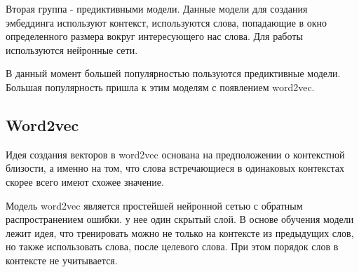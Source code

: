 \documentclass[a4paper,14pt]{article}
\begin{document}

Вторая группа - предиктивными модели.
Данные модели для создания эмбеддинга используют контекст, используются слова, попадающие в окно определенного размера вокруг интересующего нас слова.
Для работы используются нейронные сети.

В данный момент большей популярностью пользуются предиктивные модели.
Большая популярность пришла к этим моделям с появлением word2vec.

\subsection{Word2vec}
	
	Идея создания векторов в word2vec основана на предположении о контекстной близости, а именно на том, что слова встречающиеся в одинаковых контекстах скорее всего имеют схожее значение.
	
	Модель word2vec является простейшей нейронной сетью с обратным распространением ошибки.
	у нее один скрытый слой.
	В основе обучения модели лежит идея, что тренировать можно не только на контексте из предыдущих слов, но также использовать слова, после целевого слова.
	При этом порядок слов в контексте не учитывается.

	

\end{document}
